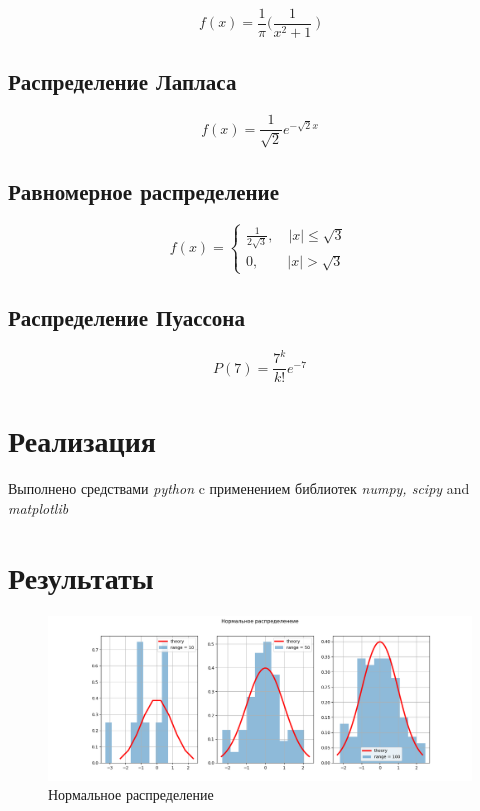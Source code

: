 \documentclass[12pt]{article}
\begin{document}
\begin{equation}
f(x)= \frac{1}{\pi}\bigg( \frac{1}{x^2 + 1}\ \bigg)
\end{equation}

\subsection{Распределение Лапласа}

\begin{equation} 
f(x)= \frac{1}{\sqrt{2}}e^{-\sqrt{2}x}
\end{equation}

\subsection{Равномерное распределение}

\begin{equation}
      f(x) = 
      \begin{cases}
      \frac{1}{2\sqrt{3}}, \quad |x| \leq \sqrt{3} \\
      0, \qquad |x| > \sqrt{3}
      \end{cases}
\end{equation}

\subsection{Распределение Пуассона}

\begin{equation}
P(7) = \frac{7^k}{k!}e^{-7}
\end{equation}

\pagebreak

\section{Реализация}
Выполнено средствами \textit{python} c применением библиотек \textit{numpy, scipy} and \textit{matplotlib}

\section{Результаты}

\begin{figure}[h!]
\begin{center}
\includegraphics[width=\textwidth]{normal.png} 
\caption{Нормальное распределение}
\end{center}
\end{figure}
\end{document}
